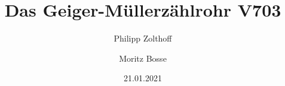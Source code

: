 

\author{Philipp Zolthoff \and Moritz Bosse}
\title{Das Geiger-Müllerzählrohr V703}
\date{21.01.2021}



\maketitle
\tableofcontents

\ignorespacesafterend
\newpage



%
%







\printbibliography





